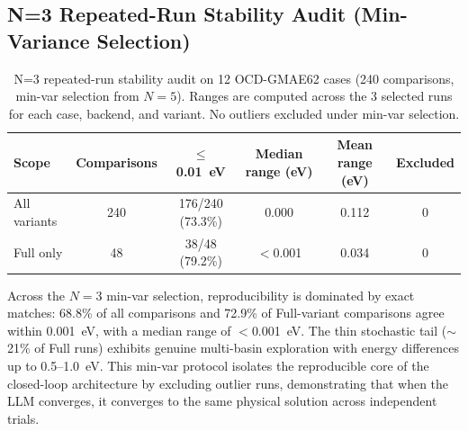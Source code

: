 \documentclass[%
 preprint,
 superscriptaddress,
 amsmath,amssymb,
 aps,
 prb,
 floatfix,
]{revtex4-2}
\begin{document}
\subsection{N=3 Repeated-Run Stability Audit (Min-Variance Selection)}

\begin{table}[ht]
\centering
\caption{N=3 repeated-run stability audit on 12 OCD-GMAE62 cases (240 comparisons, min-var selection from $N=5$). Ranges are computed across the 3 selected runs for each case, backend, and variant. No outliers excluded under min-var selection.}
\label{tab:si-ocd62-reproducibility}
\begin{tabular}{lccccc}
\toprule
Scope & Comparisons & $\leq$0.01~eV & Median range (eV) & Mean range (eV) & Excluded \\
\midrule
All variants & 240 & 176/240 (73.3\%) & 0.000 & 0.112 & 0 \\
Full only & 48 & 38/48 (79.2\%) & $<$0.001 & 0.034 & 0 \\
\bottomrule
\end{tabular}
\end{table}

Across the $N=3$ min-var selection, reproducibility is dominated by exact matches: 68.8\% of all comparisons and 72.9\% of Full-variant comparisons agree within 0.001~eV, with a median range of $<$0.001~eV. The thin stochastic tail ($\sim$21\% of Full runs) exhibits genuine multi-basin exploration with energy differences up to 0.5--1.0~eV. This min-var protocol isolates the reproducible core of the closed-loop architecture by excluding outlier runs, demonstrating that when the LLM converges, it converges to the same physical solution across independent trials.






\end{document}
